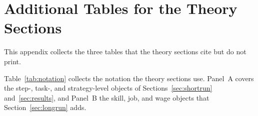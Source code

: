 \section{Additional Tables for the Theory Sections}
\label{app:theory_tables}
\label{app:jobdesign_example}
\suppressfloats[t]

This appendix collects the three tables that the theory sections cite but do not print.

Table~\ref{tab:notation} collects the notation the theory sections use.
Panel~A covers the step-, task-, and strategy-level objects of Sections~\ref{sec:shortrun} and~\ref{sec:results}, and Panel~B the skill, job, and wage objects that Section~\ref{sec:longrun} adds.


